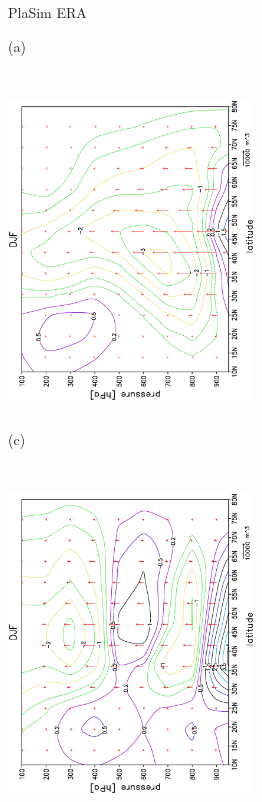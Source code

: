 \documentclass[12pt,a4paper,twoside,openright,headinclude,liststotoc,bibtotoc]{scrreprt}
\begin{document}
\begin{figure}[b]
\hspace{4.0cm}PlaSim \vspace{0.2cm} \hspace{7.3cm} ERA \\
\parbox{8.5cm}{\hspace{0.90cm}\begin{scriptsize}(a)\end{scriptsize} \vspace{-0.5cm} \\
\includegraphics[height=8.5cm,width=6.5cm,angle=-90]
{eps/epdjf.eps}
}
\parbox{8.5cm}{\hspace{0.90cm}\begin{scriptsize}(c)\end{scriptsize} \vspace{-0.5cm} \\
\includegraphics[height=8.5cm,width=6.5cm,angle=-90]
{eps/epdjf_era40.eps}
}
\end{figure}
\end{document}
